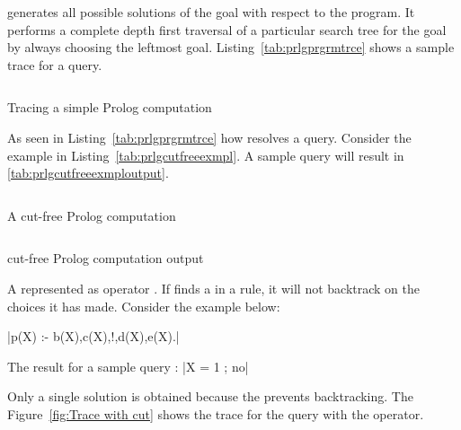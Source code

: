 \documentclass[proposal.tex]{subfiles}
\begin{document}
 generates all possible solutions of the goal with respect to the  program. It performs a complete
depth first traversal of a particular search tree for the goal by always choosing the leftmost goal. Listing~\ref{tab:prlgprgrmtrce} shows
a sample trace for a query.

\begin{code-list}[H]
  \begin{singlespace}
    \inputminted[linenos]{prolog}{prologprogramtrace.pl}
  \end{singlespace}
  \caption{Tracing a simple Prolog computation \cite{Sterling:1994:APA:175753}}
\label{tab:prlgprgrmtrce}
\end{code-list}

As seen in Listing~\ref{tab:prlgprgrmtrce} how  resolves a query. Consider the example in 
Listing~\ref{tab:prlgcutfreeexmpl}. A sample query  will result in \ref{tab:prlgcutfreeexmploutput}. 

\begin{code-list}[H]
  \begin{singlespace}
    \inputminted[linenos]{prolog}{prlgcutfreeexmpl.pl}
  \end{singlespace}
  \caption{A cut-free Prolog computation \cite{website:cutprologunionedu}}
\label{tab:prlgcutfreeexmpl}
\end{code-list}

\begin{code-list}[H]
  \begin{singlespace}
    \inputminted[linenos]{prolog}{prlgcutfreeexmploutput.pl}
  \end{singlespace}
  \caption{cut-free Prolog computation output\cite{website:cutprologunionedu}}
\label{tab:prlgcutfreeexmploutput}
\end{code-list}

A  represented as \prologConstruct{!} operator \cite{website:prologcut}.
If  finds a  in a rule, it will not backtrack on the choices it has made. Consider the example below:

|p(X) :- b(X),c(X),!,d(X),e(X).|

The result for a sample query :
|X = 1 ; no|

Only a single solution is obtained because the  prevents backtracking. The Figure~\ref{fig:Trace with cut} shows the 
trace for the query with the  operator.
\end{document}
